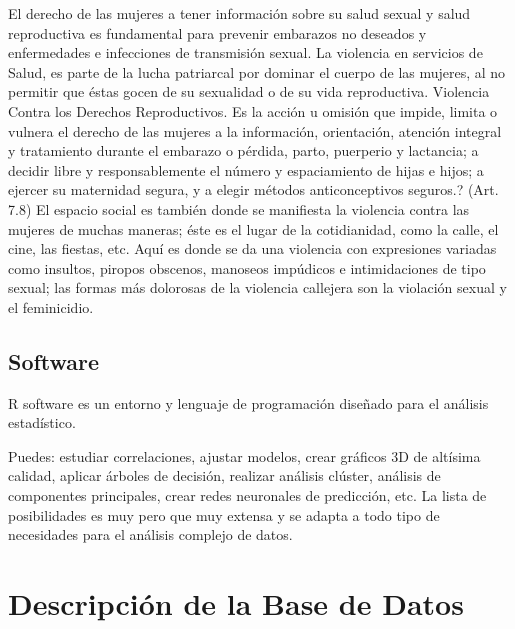 El derecho de las mujeres a tener información sobre su salud sexual y salud reproductiva es fundamental para prevenir embarazos no deseados y enfermedades e infecciones de transmisión sexual. La violencia en servicios
de Salud, es parte de la lucha patriarcal por dominar el cuerpo de las mujeres, al no permitir que éstas gocen de su sexualidad o de su vida reproductiva.
Violencia Contra los Derechos Reproductivos. Es la acción u omisión que impide, limita o vulnera el derecho de las mujeres a la información, orientación, atención integral y tratamiento durante el embarazo o pérdida, parto, puerperio y lactancia; a decidir libre y responsablemente el número y espaciamiento de hijas e hijos; a ejercer su maternidad segura, y a elegir métodos anticonceptivos seguros.? (Art. 7.8)
El espacio social es también donde se manifiesta la violencia contra las mujeres de muchas maneras; éste es el lugar de la cotidianidad, como la calle, el cine, las fiestas, etc. Aquí es donde se da una violencia con expresiones variadas como insultos, piropos obscenos, manoseos impúdicos e intimidaciones de tipo sexual; las formas más dolorosas de la violencia callejera son la violación sexual y el feminicidio.

\subsection{Software}
R software es un entorno y lenguaje de programación diseñado para el análisis estadístico.

Puedes: estudiar correlaciones, ajustar modelos, crear gráficos 3D de altísima calidad, aplicar árboles de decisión, realizar análisis clúster, análisis de componentes principales, crear redes neuronales de predicción, etc.
La lista de posibilidades es muy pero que muy extensa y se adapta a todo tipo de necesidades para el análisis complejo de datos.

\section{Descripción de la Base de Datos}
